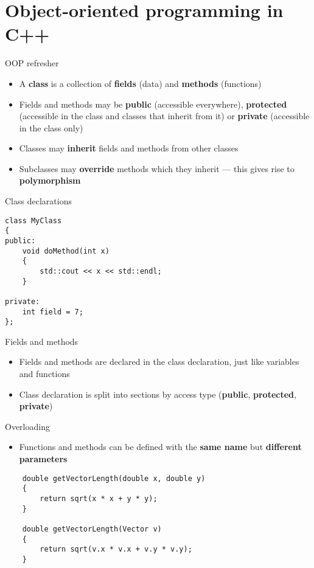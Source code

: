 \part{Object-oriented programming in C++}
\frame{\partpage}

\begin{frame}[fragile]{OOP refresher}
    \begin{itemize}
        \item A \textbf{class} is a collection of \textbf{fields} (data) and \textbf{methods} (functions) \pause
        \item Fields and methods may be \textbf{public} (accessible everywhere),
            \textbf{protected} (accessible in the class and classes that inherit from it)
            or \textbf{private} (accessible in the class only) \pause
        \item Classes may \textbf{inherit} fields and methods from other classes \pause
        \item Subclasses may \textbf{override} methods which they inherit --- this gives rise to \textbf{polymorphism}
    \end{itemize}
\end{frame}

\begin{frame}[fragile]{Class declarations}
    \begin{lstlisting}
class MyClass
{
public:
    void doMethod(int x)
    {
        std::cout << x << std::endl;
    }

private:
    int field = 7;
};
    \end{lstlisting}
\end{frame}

\begin{frame}[fragile]{Fields and methods}
    \begin{itemize}
        \item Fields and methods are declared in the class declaration, just like variables and functions \pause
        \item Class declaration is split into sections by access type (\textbf{public}, \textbf{protected}, \textbf{private})
    \end{itemize}
\end{frame}

\begin{frame}[fragile]{Overloading}
    \begin{itemize}
        \item Functions and methods can be defined with the \textbf{same name} but \textbf{different parameters}
    \end{itemize}
    \pause
    \begin{lstlisting}
    double getVectorLength(double x, double y)
    {
        return sqrt(x * x + y * y);
    }

    double getVectorLength(Vector v)
    {
        return sqrt(v.x * v.x + v.y * v.y);
    }
    \end{lstlisting}
\end{frame}

